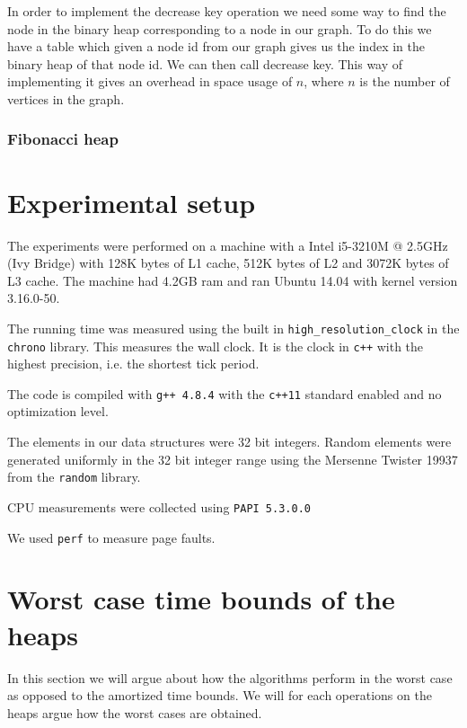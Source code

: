 \documentclass[a4paper,oneside,article,11pt]{memoir}
\begin{document}
In order to implement the decrease key operation we need some way to find the node in the binary heap corresponding to a node in our graph. To do this we have a table which given a node id from our graph gives us the index in the binary heap of that node id. We can then call decrease key. This way of implementing it gives an overhead in space usage of $n$, where $n$ is the number of vertices in the graph.

\subsection{Fibonacci heap}

\chapter{Experimental setup}
\label{chtp:experiment_setup}

The experiments were performed on a machine with a Intel i5-3210M @ 2.5GHz (Ivy Bridge) with 128K bytes of L1 cache, 512K bytes of L2 and 3072K bytes of L3 cache. The machine had 4.2GB ram and ran Ubuntu 14.04 with kernel version 3.16.0-50.

The running time was measured using the built in \texttt{high\_resolution\_clock} in the \texttt{chrono} library. This measures the wall clock. It is the clock in \texttt{c++} with the highest precision, i.e. the shortest tick period.

The code is compiled with \texttt{g++ 4.8.4} with the \texttt{c++11} standard enabled and no optimization level.

The elements in our data structures were 32 bit integers. Random elements were generated uniformly in the 32 bit integer range using the Mersenne Twister 19937 from the \texttt{random} library.

CPU measurements were collected using \texttt{PAPI 5.3.0.0}

We used \texttt{perf} to measure page faults.


\chapter{Worst case time bounds of the heaps}
In this section we will argue about how the algorithms perform in the worst case as opposed to the amortized time bounds. We will for each operations on the heaps argue how the worst cases are obtained.
\end{document}
